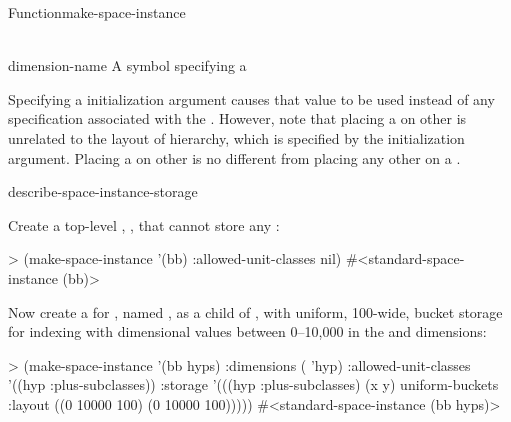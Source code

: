 \documentclass[10pt,twoside,english,pdftex]{article}
\begin{document}
\begin{functiondoc}{Function}{make-space-instance}{
      \\ 
      \\
    \returns{} }
\fnterms
\begin{args}{dimension-name}
 A symbol specifying a  
\end{args}

\fndescription 
%
%
%
%
Specifying a  initialization argument
causes that value to be used instead of any 
specification associated with the .  However, note that
placing a  on other  is unrelated
to the layout of  hierarchy, which is specified
by the  initialization argument.  Placing a
 on other  is no different from
placing any other  on a .

\begin{alsos}{describe-space-instance-storage}
\also[children-of]
\also[dimensions-of]
\also[parent-of]
\end{alsos}

\fnexamples
Create a top-level , ,
that cannot store any :
%
\W\supp
\begin{example}
> (make-space-instance '(bb) 
     :allowed-unit-classes nil)
#<standard-space-instance (bb)>
\end{example}
%
%
%
Now create a  for  ,
named , as a child of , with uniform, 100-wide, bucket
storage for indexing  with dimensional values between 
0--10,000 in the  and  dimensions:
%
\W\supp\notpretop
\begin{example}
> (make-space-instance '(bb hyps)
     :dimensions ( 'hyp)
     :allowed-unit-classes '((hyp :plus-subclasses))
     :storage '(((hyp :plus-subclasses) (x y) 
                 uniform-buckets :layout ((0 10000 100)
                                          (0 10000 100)))))
#<standard-space-instance (bb hyps)>
\end{example}


\end{functiondoc}
\end{document}
